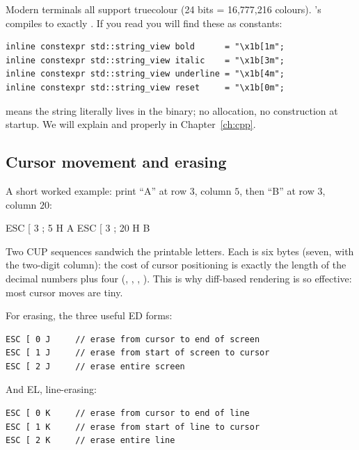 Modern terminals all support truecolour (24 bits = 16,777,216 colours).
\maya{}'s  compiles to exactly \code{ESC [ 38 ; 2 ;
R ; G ; B m}. If you read 
you will find these as  constants:

\begin{lstlisting}
inline constexpr std::string_view bold      = "\x1b[1m";
inline constexpr std::string_view italic    = "\x1b[3m";
inline constexpr std::string_view underline = "\x1b[4m";
inline constexpr std::string_view reset     = "\x1b[0m";
\end{lstlisting}

 means the string literally lives in the binary; no
allocation, no construction at startup. We will explain
 and  properly in
Chapter~\ref{ch:cpp}.

\subsection{Cursor movement and erasing}

A short worked example: print ``A'' at row $3$, column $5$, then
``B'' at row $3$, column $20$:

\begin{terminalbox}
ESC [ 3 ; 5 H A ESC [ 3 ; 20 H B
\end{terminalbox}

Two CUP sequences sandwich the printable letters. Each is six bytes
(seven, with the two-digit column): the cost of cursor positioning is
exactly the length of the decimal numbers plus four (,
\code{[}, \code{;}, ). This is why diff-based rendering is so
effective: most cursor moves are tiny.

For erasing, the three useful ED forms:

\begin{lstlisting}
ESC [ 0 J     // erase from cursor to end of screen
ESC [ 1 J     // erase from start of screen to cursor
ESC [ 2 J     // erase entire screen
\end{lstlisting}

And EL, line-erasing:

\begin{lstlisting}
ESC [ 0 K     // erase from cursor to end of line
ESC [ 1 K     // erase from start of line to cursor
ESC [ 2 K     // erase entire line
\end{lstlisting}

